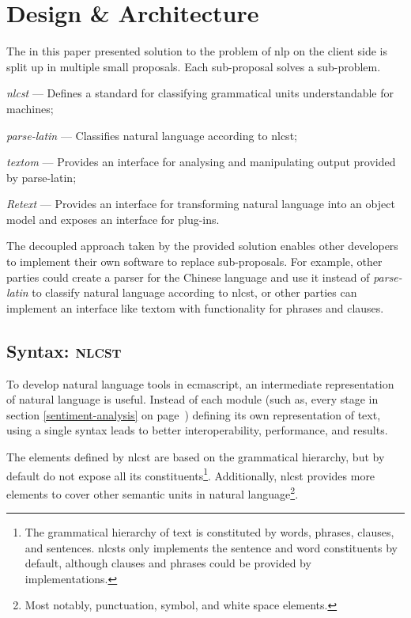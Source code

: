 \chapter{Design \& Architecture}\label{design}

The in this paper presented solution to the problem of \gls{nlp} on the
client side is split up in multiple small proposals. Each sub-proposal
solves a sub-problem.

\begin{aenumerate}
\item\emph{\acrshort{nlcst}} --- Defines a standard for classifying
  grammatical units understandable for machines;
\item\emph{parse-latin} --- Classifies natural language according to
  \gls{nlcst};
\item\emph{\gls{textom}} --- Provides an interface for analysing and
  manipulating output provided by parse-latin;
\item\emph{Retext} --- Provides an interface for transforming natural
  language into an object model and exposes an interface for plug-ins.
\end{aenumerate}

\noindent The decoupled approach taken by the provided solution enables other
  developers to implement their own software to replace sub-proposals.
For example, other parties could create a parser for the Chinese language and
  use it instead of \emph{parse-latin} to classify natural language according
  to \gls{nlcst}, or other parties can implement an interface like
  \gls{textom} with functionality for phrases and clauses.

\section{Syntax: \textsc{nlcst}}\label{syntax}

To develop natural language tools in \gls{ecmascript}, an intermediate
  representation of natural language is useful.
Instead of each module (such as, every stage in section
  \ref{sentiment-analysis} on page~\pageref{apendix-a-nlcst-definition})
  defining its own representation of text, using a single syntax leads to
  better interoperability, performance, and results.

The elements defined by \acrfull{nlcst} are based on the grammatical
  hierarchy, but by default do not expose all its constituents\footnote{The
      grammatical hierarchy of text is constituted by words, phrases,
      clauses, and sentences.
    \glspl{nlcst} only implements the sentence and word constituents
    by default, although clauses and phrases could be provided by
    implementations.}.
Additionally, \gls{nlcst} provides more elements to cover other semantic
  units in natural language\footnote{Most
    notably, punctuation, symbol, and white space elements.}.

